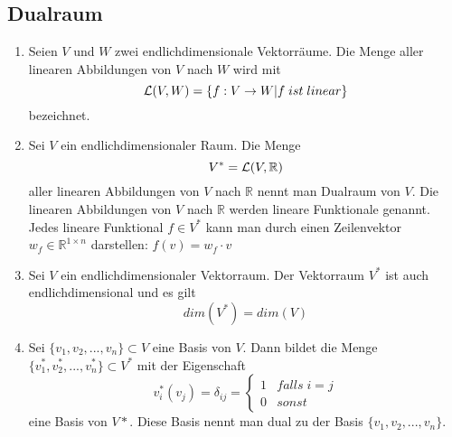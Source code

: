 \documentclass[a4paper,twocolumn,10pt]{article}
\begin{document}
\subsection{Dualraum}
\begin{enumerate}[label=$\bullet$]
\item Seien $V$ und $W$ zwei endlichdimensionale Vektorräume. Die Menge aller linearen Abbildungen von $V$ nach $W$ wird mit
\begin{equation*}
{\cal L}(V,W)=\{f:V\rightarrow W|f\;ist\;linear\}
\end{equation*}
bezeichnet.
\item Sei $V$ ein endlichdimensionaler Raum. Die Menge
\begin{equation}
V^*={\cal L}(V,\mathbb{R})
\end{equation}
aller linearen Abbildungen von $V$ nach $\mathbb{R}$ nennt man Dualraum von $V$. Die linearen Abbildungen von $V$ nach $\mathbb{R}$ werden lineare Funktionale genannt.\\
Jedes lineare Funktional $f\in V^*$ kann man durch einen Zeilenvektor $w_f\in \mathbb{R}^{1\times n}$ darstellen: $f(v)=w_f\cdot v$
\item Sei $V$ ein endlichdimensionaler Vektorraum. Der Vektorraum $V^*$ ist auch endlichdimensional und es gilt
\begin{equation*}
dim(V^*)=dim(V)
\end{equation*}
\item Sei $\{v_1,v_2,...,v_n\}\subset V$ eine Basis von $V$. Dann bildet die Menge $\{v_1^*, v_2^*,...,v_n^*\}\subset V^*$ mit der Eigenschaft
\begin{equation*}
v_i^*(v_j)=\delta_{ij}=\begin{cases}1 & falls\;i=j \\ 0 & sonst\end{cases}
\end{equation*}
eine Basis von $V*$. Diese Basis nennt man dual zu der Basis $\{v_1,v_2,...,v_n\}$.
\end{enumerate}
\end{document}
